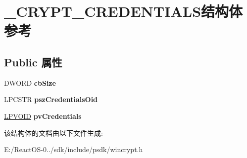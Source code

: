 \hypertarget{struct___c_r_y_p_t___c_r_e_d_e_n_t_i_a_l_s}{}\section{\+\_\+\+C\+R\+Y\+P\+T\+\_\+\+C\+R\+E\+D\+E\+N\+T\+I\+A\+L\+S结构体 参考}
\label{struct___c_r_y_p_t___c_r_e_d_e_n_t_i_a_l_s}
\subsection*{Public 属性}
\begin{DoxyCompactItemize}
\item 
\mbox{\label{struct___c_r_y_p_t___c_r_e_d_e_n_t_i_a_l_s_a4b05a00b2fb833a3670f19e9124f1e26}} 
D\+W\+O\+RD {\bfseries cb\+Size}
\item 
\mbox{\label{struct___c_r_y_p_t___c_r_e_d_e_n_t_i_a_l_s_aab89c331fd0f82987cd50767abc435c6}} 
L\+P\+C\+S\+TR {\bfseries psz\+Credentials\+Oid}
\item 
\mbox{\label{struct___c_r_y_p_t___c_r_e_d_e_n_t_i_a_l_s_a4c760fe183d9f0647bb14bdd02ec4880}} 
\hyperlink{interfacevoid}{L\+P\+V\+O\+ID} {\bfseries pv\+Credentials}
\end{DoxyCompactItemize}


该结构体的文档由以下文件生成\+:\begin{DoxyCompactItemize}
\item 
E\+:/\+React\+O\+S-\/0../sdk/include/psdk/wincrypt.\+h\end{DoxyCompactItemize}
